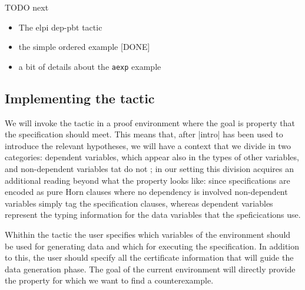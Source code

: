 \begin{metanote}
  TODO next
  \begin{itemize}
  \item The elpi dep-pbt tactic
  \item  the simple ordered example [DONE]
  \item a bit of details about the \texttt{aexp} example
  \end{itemize}
\end{metanote} 

\subsection{Implementing the tactic}
We will invoke the tactic in a
proof environment  where the goal is %
property that the specification should meet. This means that, after
\lsti|intro| has been used to introduce the relevant hypotheses, we
will have a context %
that we  divide in two categories: dependent
variables, which appear also in the types of other variables, and
non-dependent variables tat do not %
; in our setting this division acquires an additional reading beyond
what the property looks like: since specifications are encoded as pure
Horn clauses where no dependency is involved non-dependent variables
simply tag the specification clauses, whereas dependent variables
represent the typing information for the data variables that the
speficications use.

Whithin the tactic the user
specifies which variables of the environment should be used for
generating data and which for executing the specification. In addition
to this, the user should specify all the certificate information that
will guide the data generation phase. The goal of the current
environment will directly provide the property for which we want to
find a counterexample. %

